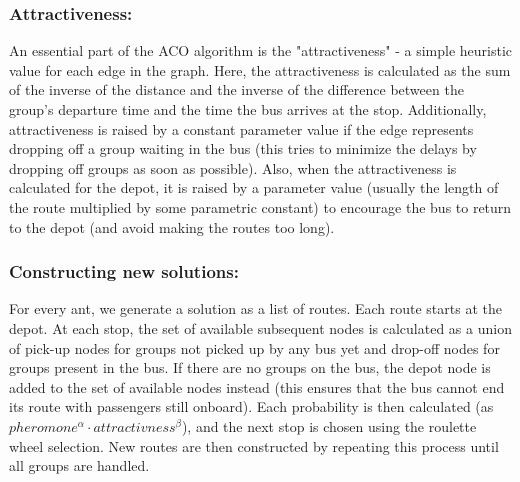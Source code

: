 \subsubsection*{Attractiveness:}
An essential part of the ACO algorithm is the "attractiveness" - a simple heuristic value for each edge in the graph. Here, the attractiveness is calculated as the sum of the inverse of the distance and the inverse of the difference between the group's departure time and the time the bus arrives at the stop. Additionally, attractiveness is raised by a constant parameter value if the edge represents dropping off a group waiting in the bus (this tries to minimize the delays by dropping off groups as soon as possible). Also, when the attractiveness is calculated for the depot, it is raised by a parameter value (usually the length of the route multiplied by some parametric constant) to encourage the bus to return to the depot (and avoid making the routes too long).

\subsubsection*{Constructing new solutions:}
For every ant, we generate a solution as a list of routes. Each route starts at the depot. At each stop, the set of available subsequent nodes is calculated as a union of pick-up nodes for groups not picked up by any bus yet and drop-off nodes for groups present in the bus. If there are no groups on the bus, the depot node is added to the set of available nodes instead (this ensures that the bus cannot end its route with passengers still onboard). Each probability is then calculated (as $pheromone^\alpha \cdot attractivness^\beta$), and the next stop is chosen using the roulette wheel selection. New routes are then constructed by repeating this process until all groups are handled.

